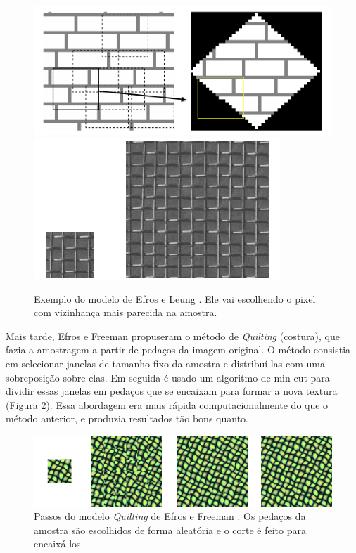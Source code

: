 \begin{figure}[!ht]
	\centering
	\includegraphics[width=\linewidth*2/3]{files/assets/articles/efros3.png}
	\includegraphics[width=\linewidth*5/6]{files/assets/articles/efros1.png}
	\caption{Exemplo do modelo de Efros e Leung \cite{Efros1999}.
	Ele vai escolhendo o pixel
	com vizinhança mais parecida na amostra.}
	\label{efros}
\end{figure}

Mais tarde, Efros e Freeman \cite{Efros2001}
propuseram o método de \textit{Quilting} (costura),
que fazia a amostragem a partir
de pedaços da imagem original. 
O método consistia em selecionar
janelas de tamanho fixo da amostra
e distribuí-las com uma sobreposição
sobre elas. Em seguida é usado
um algoritmo de min-cut para dividir
essas janelas em pedaços que se encaixam
para formar a nova textura (Figura \ref{efros2}).
Essa abordagem era mais rápida 
computacionalmente do que o método
anterior, e produzia resultados
tão bons quanto.

\begin{figure}[!ht]
	\includegraphics[width=\linewidth]{files/assets/articles/efros2.png}
	\caption{Passos do modelo \textit{Quilting} de Efros e Freeman
	\cite{Efros2001}. Os pedaços da amostra são escolhidos de forma
	aleatória e o corte é feito para encaixá-los.}
	\label{efros2}
\end{figure}

